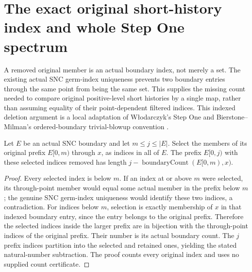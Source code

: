 \section{The exact original short-history index and whole Step One spectrum}

A removed original member is an actual boundary index, not merely a set.
The existing actual SNC germ-index uniqueness prevents two boundary entries
through the same point from being the same set. This supplies the missing
count needed to compare original positive-level short histories by a single
map, rather than assuming equality of their point-dependent filtered indices.
This indexed deletion argument is a local adaptation of W\l odarczyk's Step One
and Bierstone--Milman's ordered-boundary trivial-blowup convention
\cite{wlodarczyk05-hironaka,bierstone-milman08-functoriality}.

\begin{lemma}
\label{hir:original-member-filtered-prefix-exact-count}
\leanok
{}
Let $E$ be an actual SNC boundary and let $m\leq j\leq|E|$. Select the
members of its original prefix $E[0,m)$ through $x$, as indices in all of $E$.
The prefix $E[0,j)$ with these selected indices removed has length
$j-\operatorname{boundaryCount}(E[0,m),x)$.
\end{lemma}
\begin{proof}
Every selected index is below $m$. If an index at or above $m$ were selected,
its through-point member would equal some actual member in the prefix below
$m$; the genuine SNC germ-index uniqueness would identify these two indices,
a contradiction. For indices below $m$, selection is exactly membership of
$x$ in that indexed boundary entry, since the entry belongs to the original
prefix. Therefore the selected indices inside the larger prefix are in
bijection with the through-point indices of the original prefix. Their number
is its actual boundary count. The $j$ prefix indices partition into the
selected and retained ones, yielding the stated natural-number subtraction.
The proof counts every original index and uses no supplied count certificate.
\end{proof}

